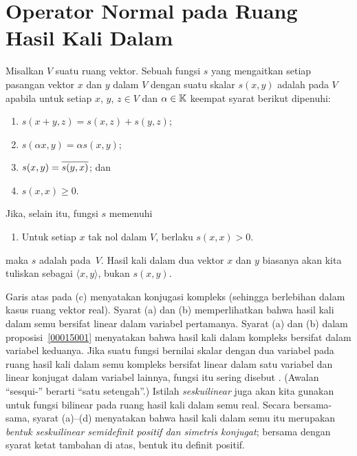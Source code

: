 \section{Operator Normal pada Ruang Hasil Kali Dalam}
\begin{defn} Misalkan $V$ suatu ruang vektor. Sebuah fungsi $s$ yang mengaitkan setiap pasangan vektor
$x$ dan $y$ dalam $V$ dengan suatu skalar
$s(x,y)$ adalah
 pada $V$ apabila untuk setiap $x$, $y$, $z \in V$ dan $\alpha \in \mathbb{K}$ keempat syarat berikut dipenuhi:
 \begin{enumerate}
   \item $s(x + y , z) = s(x,z) + s(y,z)$;
   \item $s(\alpha x,y) = \alpha s(x,y)$;
   \item $s(x,y) = \overline{s(y,x)}$; dan
   \item $s(x,x) \ge 0$.
 \end{enumerate}
 Jika, selain itu, fungsi $s$ memenuhi
  \begin{enumerate}
    \item Untuk setiap $x$ tak nol dalam $V$, berlaku $s(x,x) > 0$.
  \end{enumerate}
maka $s$ adalah
 pada~$V$. Hasil kali dalam dua vektor $x$ dan $y$ biasanya akan kita tuliskan sebagai
$\langle x,y \rangle$, bukan $s(x,y)$.

\noindent Garis atas pada (c) menyatakan konjugasi kompleks (sehingga berlebihan dalam kasus ruang vektor real).
Syarat (a) dan (b) memperlihatkan bahwa hasil kali dalam semu bersifat linear dalam variabel pertamanya. Syarat (a) dan (b) dalam
proposisi~\ref{00015001} menyatakan bahwa hasil kali dalam kompleks bersifat
 dalam variabel keduanya. Jika suatu fungsi bernilai skalar dengan dua variabel pada ruang hasil kali dalam semu kompleks
bersifat linear dalam satu variabel dan linear konjugat dalam variabel lainnya, fungsi itu sering disebut
. (Awalan ``sesqui-'' berarti ``satu setengah''.) Istilah \emph{seskuilinear} juga akan kita gunakan untuk
fungsi bilinear pada ruang hasil kali dalam semu real. Secara bersama-sama, syarat (a)--(d) menyatakan bahwa hasil kali dalam semu itu merupakan
\emph{bentuk seskuilinear semidefinit positif dan simetris konjugat}; bersama dengan syarat ketat tambahan di atas, bentuk itu definit positif.
\end{defn}

